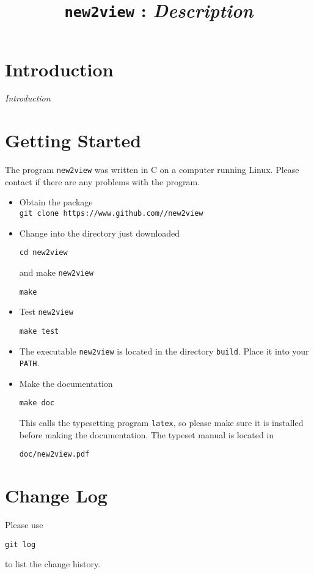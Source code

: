 \documentclass[a4paper, english]{article}
\begin{document}
\title{\texttt{new2view} : \emph{Description}}
\author{}

\date{}
\maketitle

\section{Introduction} 
\emph{Introduction}

\section{Getting Started}
The program \texttt{new2view} was written in C on a computer running Linux.
Please contact \texttt{} if there are any problems
with the program.
\begin{itemize}
\item Obtain the package\\
\texttt{git clone https://www.github.com//new2view}
\item Change into the directory just downloaded
\begin{verbatim}
cd new2view
\end{verbatim}
and make \texttt{new2view}
\begin{verbatim}
make
\end{verbatim}
\item Test \texttt{new2view}
\begin{verbatim}
make test
\end{verbatim}
\item The executable \texttt{new2view} is located in the
  directory \texttt{build}. Place it into your \texttt{PATH}.
\item Make the documentation
\begin{verbatim}
make doc
\end{verbatim}
This calls the typesetting program \texttt{latex}, so please make sure
it is installed before making the documentation. The typeset manual is
located in
\begin{verbatim}
doc/new2view.pdf
\end{verbatim}
\end{itemize}

\section{Change Log}
Please use
\begin{verbatim}
git log
\end{verbatim}
to list the change history.

\end{document}
